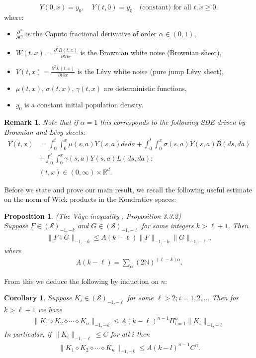 \documentclass[12pt]{article}%
\newtheorem{proposition}[theorem]{Proposition}
\newtheorem{corollary}[theorem]{Corollary}
\newtheorem{remark}[theorem]{Remark}
\numberwithin{equation}{section}
\def\S{\mathcal{S}}
\begin{document}
\begin{equation}
Y(0,x) = y_0, \quad Y(t,0) = y_0 \quad \text{(constant) for all } t,x \ge 0,
\end{equation}
where:
\begin{itemize}
    \item $\frac{\partial^\alpha}{\partial t^\alpha}$ is the Caputo fractional derivative of order $\alpha \in (0,1)$,
    \item $W(t,x) = \frac{\partial^2 B(t,x)}{\partial t \partial x}$ is the Brownian white noise (Brownian sheet),
    \item $V(t,x) = \frac{\partial^2 L(t,x)}{\partial t \partial x}$ is the L\'evy white noise (pure jump L\'evy sheet),
    \item $\mu(t,x)$, $\sigma(t,x)$, $\gamma(t,x)$ are deterministic functions,
    \item $y_0$ is a constant initial population density.
\end{itemize}
\begin{remark}
    Note that if $\alpha=1$ this corresponds to the following SDE driven by Brownian and L\' evy sheets:
\begin{align}\label{heatgrowth}
 	 Y(t,x)&= \int_0^t \int_0^x \mu(s,a) Y(s,a)ds da+\int_0^t \int_0^x \sigma(s,a)Y(s,a) B(ds,da)\nonumber\\
     &+\int_0^t \int_0^x \gamma(s,a)Y(s,a)L(ds,da);\nonumber\\
     & (t,x)\in (0,\infty)\times \mathbb{R}^{d}.
 	 	\end{align}
        \end{remark}
        
Before we state and prove our main result, we recall the following useful estimate on the norm of Wick products in the Kondratiev spaces:

\begin{proposition}(The V\r{a}ge inequality \cite{HOUZ}, Proposition 3.3.2)\\
Suppose $F\in (\S)_{-1,-k}$ and $G \in (\S)_{-1,-\ell}$ for some integers $k>\ell +1$.
Then
\begin{align}
 \|F \diamond G \|_{-1,-k} \leq A(k-\ell) \|F\|_{-1,-k} \|G\|_{-1,-\ell},  
\end{align}
where
\begin{align}
    A(k-\ell) = \sum_{\alpha} (2\mathbb{N})^{(\ell -k)\alpha}.
\end{align}
\end{proposition}
From this we deduce the following by induction on $n$:
\begin{corollary} \label{5.2}
    Suppose $K_i \in (\S)_{-1,-\ell}$ for some $\ell > 2; i=1,2, ...$
    Then for $k> \ell +1$ we have
    \begin{align}
        \|K_1 \diamond K_2 \diamond \cdots \diamond K_n\|_{-1,-k} \leq A(k-\ell)^{n-1} \Pi_{i=1}^n \|K_i\|_{-1,-\ell}
    \end{align}
    In particular, if $\|K_i\|_{-1,-\ell} \leq C$ for all $i$ then
  \begin{align}
        \|K_1 \diamond K_2 \diamond \cdots \diamond K_n\|_{-1,-k} \leq A(k-l)^{n-1} C^n.
    \end{align}  
\end{corollary}
\end{document}
